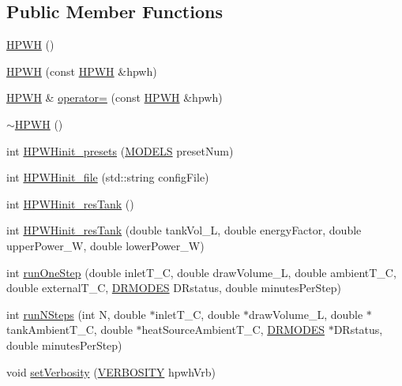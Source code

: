 \subsection*{Public Member Functions}
\begin{DoxyCompactItemize}
\item 
\hyperlink{class_h_p_w_h_a07cd672278715ee61604ae26137d16f7}{H\-P\-W\-H} ()
\item 
\hyperlink{class_h_p_w_h_aa28907ae69a5f53e53bb14554c9af73f}{H\-P\-W\-H} (const \hyperlink{class_h_p_w_h}{H\-P\-W\-H} \&hpwh)
\item 
\hyperlink{class_h_p_w_h}{H\-P\-W\-H} \& \hyperlink{class_h_p_w_h_a6e231a8737d540f89aeeb028663f65a9}{operator=} (const \hyperlink{class_h_p_w_h}{H\-P\-W\-H} \&hpwh)
\item 
\hyperlink{class_h_p_w_h_ad92e11f51e981157e85ac8855269d50a}{$\sim$\-H\-P\-W\-H} ()
\item 
int \hyperlink{class_h_p_w_h_a74b3a6c1352adb5d38e7c00ad5952f30}{H\-P\-W\-Hinit\-\_\-presets} (\hyperlink{class_h_p_w_h_acf117eb928a21b7b757b653455a2338e}{M\-O\-D\-E\-L\-S} preset\-Num)
\item 
int \hyperlink{class_h_p_w_h_a348c1c4a90ec1ee5e91c84ab8d3bc5b1}{H\-P\-W\-Hinit\-\_\-file} (std\-::string config\-File)
\item 
int \hyperlink{class_h_p_w_h_ac092212830c4e023b1314845d79d5461}{H\-P\-W\-Hinit\-\_\-res\-Tank} ()
\item 
int \hyperlink{class_h_p_w_h_a0b8ee9f3e4773ca140b50997ad1091cf}{H\-P\-W\-Hinit\-\_\-res\-Tank} (double tank\-Vol\-\_\-\-L, double energy\-Factor, double upper\-Power\-\_\-\-W, double lower\-Power\-\_\-\-W)
\item 
int \hyperlink{class_h_p_w_h_aef8f08c0115787826a64b34897468b45}{run\-One\-Step} (double inlet\-T\-\_\-\-C, double draw\-Volume\-\_\-\-L, double ambient\-T\-\_\-\-C, double external\-T\-\_\-\-C, \hyperlink{class_h_p_w_h_a6a74814715ed6a33a75fd0d9dc3e7107}{D\-R\-M\-O\-D\-E\-S} D\-Rstatus, double minutes\-Per\-Step)
\item 
int \hyperlink{class_h_p_w_h_a904e3a0f6bdd7eaaeed43839bac779fc}{run\-N\-Steps} (int N, double $\ast$inlet\-T\-\_\-\-C, double $\ast$draw\-Volume\-\_\-\-L, double $\ast$tank\-Ambient\-T\-\_\-\-C, double $\ast$heat\-Source\-Ambient\-T\-\_\-\-C, \hyperlink{class_h_p_w_h_a6a74814715ed6a33a75fd0d9dc3e7107}{D\-R\-M\-O\-D\-E\-S} $\ast$D\-Rstatus, double minutes\-Per\-Step)
\item 
void \hyperlink{class_h_p_w_h_a7c81dfc13de82ce9ca01300bde0d4b22}{set\-Verbosity} (\hyperlink{class_h_p_w_h_aa493e3f78affa7dafde7e297cc68673c}{V\-E\-R\-B\-O\-S\-I\-T\-Y} hpwh\-Vrb)

\end{DoxyCompactItemize}
